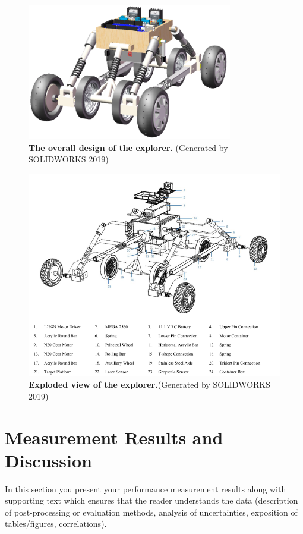 \documentclass{engr1000j-s2}
\begin{document}
  \begin{figure}[hbt!]  
  \centering
  \includegraphics[width=0.8\textwidth]{figures/overall_design.png}
  \caption{\quad \textbf{The overall design of the explorer.} (Generated by SOLIDWORKS 2019)}
  \label{fig:overall_design}
  \end{figure}

  \begin{figure}[hbt!]  
  \centering
  \includegraphics[width=\textwidth]{figures/explosive_view.png}
  \caption{\quad \textbf{Exploded view of the explorer.}(Generated by SOLIDWORKS 2019)}
  \label{fig:explosive_view}
  \end{figure}

  \hspace{1em}
  
  \section{Measurement Results and Discussion}
   In this section you present your performance measurement results along with supporting text which ensures that the reader understands the data (description of post-processing or evaluation methods, analysis of uncertainties, exposition of tables/figures, correlations). 
  
\end{document}
